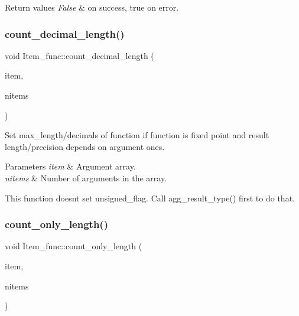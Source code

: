 \begin{DoxyRetVals}{Return values}
{\em False} & on success, true on error. \\
\hline
\end{DoxyRetVals}
\mbox{\label{classItem__func_a5fde81bfb85905be33465d41ff178fa0}} 
\subsubsection{\texorpdfstring{count\+\_\+decimal\+\_\+length()}{count\_decimal\_length()}}
{\footnotesize\ttfamily void Item\+\_\+func\+::count\+\_\+decimal\+\_\+length (\begin{DoxyParamCaption}\item[{\mbox{\hyperlink{classItem}{Item}} $\ast$$\ast$}]{item,  }\item[{uint}]{nitems }\end{DoxyParamCaption})}

Set max\+\_\+length/decimals of function if function is fixed point and result length/precision depends on argument ones.


\begin{DoxyParams}{Parameters}
{\em item} & Argument array. \\
\hline
{\em nitems} & Number of arguments in the array.\\
\hline
\end{DoxyParams}
This function doesn\textquotesingle{}t set unsigned\+\_\+flag. Call agg\+\_\+result\+\_\+type() first to do that. \mbox{\label{classItem__func_a8d850c74056662d3bb11bbb43dcacab0}} 
\subsubsection{\texorpdfstring{count\+\_\+only\+\_\+length()}{count\_only\_length()}}
{\footnotesize\ttfamily void Item\+\_\+func\+::count\+\_\+only\+\_\+length (\begin{DoxyParamCaption}\item[{\mbox{\hyperlink{classItem}{Item}} $\ast$$\ast$}]{item,  }\item[{uint}]{nitems }\end{DoxyParamCaption})}

